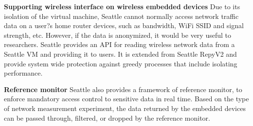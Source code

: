 \documentclass[11pt, oneside]{article}   	%
\begin{document}
\textbf{Supporting wireless interface on wireless embedded devices} 
Due to its isolation of the virtual machine, Seattle cannot normally access network traffic data on a user?s home router devices, such as bandwidth, WiFi SSID and signal strength, etc. However, if the data is anonymized, it would be very useful to researchers. Seattle provides an API for reading wireless network data from a Seattle VM and providing it to users. It is extended from Seattle RepyV2 and provide system wide protection against greedy processes that include isolating performance. 

\textbf{Reference monitor}
Seattle also provides a framework of reference monitor, to enforce mandatory access control to sensitive data in real time. Based on the type of network measurement experiment, the data returned by the embedded devices can be passed through, filtered, or dropped by the reference monitor.
\end{document}
